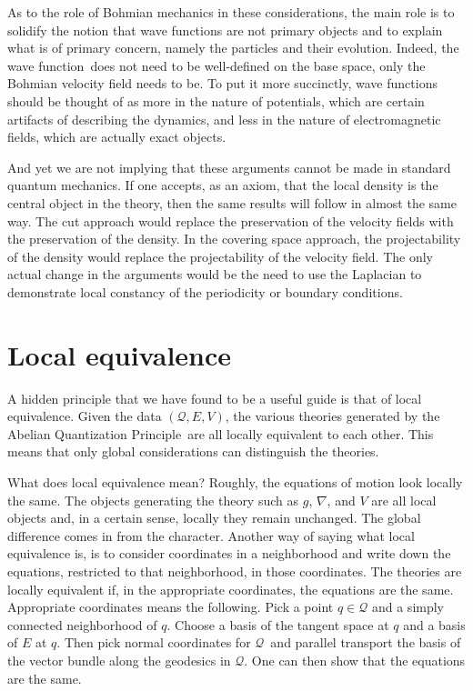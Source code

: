 \documentclass[11pt]{article}
\theoremstyle{remark}
\begin{document}
As to the role of Bohmian mechanics in these considerations, the main
role is to solidify the notion that wave functions
are not primary objects and to explain what is of primary concern,
namely the particles and their evolution.
Indeed, the wave function\ does not need to be well-defined on the base
space, only the Bohmian velocity field needs to be. 
To put it more
succinctly, wave functions should be thought of as more in the nature of
potentials, which are certain artifacts of describing the dynamics,
and less in the nature of electromagnetic fields, which are actually 
exact objects. 

And yet we are not implying that these arguments cannot be made in
standard quantum mechanics. If one accepts, as an axiom, that the local
density is the central object in the theory, then the same results
will follow in almost the same way. 
The cut 
 approach would replace the preservation of the velocity fields
with the preservation of the density. 
In the covering space approach, the projectability of the density would
 replace the projectability of the velocity field. 
The only actual change in the arguments would be the need to use the
Laplacian to demonstrate local constancy of the periodicity or boundary
conditions. 

\section{Local equivalence} \label{is:leqv}

A hidden principle that we have found to be a useful guide is that of
local equivalence. Given the data $(\ensuremath{\mathcal{Q}}, E, V)$, the various 
theories generated by
the Abelian Quantization Principle\ are all locally equivalent to each other. This means that
only global considerations
 can distinguish the theories. 


What does local equivalence 
mean? Roughly, the equations of motion look locally the same. The
objects generating the theory such as $g$, $\nabla$, and $V$ are all
local objects and, in a certain sense,  locally they remain unchanged. 
The global difference comes in from the
character. Another way of saying what local equivalence is, is to
consider coordinates in a neighborhood 
and write down the equations, restricted to that neighborhood, in those
coordinates. The theories are locally equivalent if, in the
appropriate coordinates, the equations are the same. 
 Appropriate coordinates means the following. Pick a
point $\ensuremath{q} \in \ensuremath{\mathcal{Q}}$ and a simply connected neighborhood of
\ensuremath{q}. 
Choose
a basis of the tangent space at $\ensuremath{q}$ and a basis of $E$ at
\ensuremath{q}. Then pick normal coordinates for \ensuremath{\mathcal{Q}}\ 
and parallel transport the basis
of the vector bundle along the geodesics in \ensuremath{\mathcal{Q}}. One can then show
that the equations are the same. 
\end{document}
